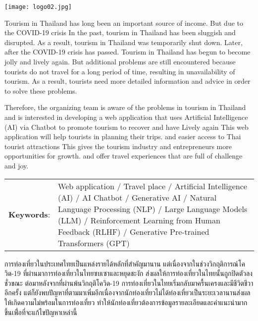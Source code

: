 \documentclass[12pt,oneside,openright,a4paper]{cpe-thai-project}
\begin{document}
\pdfstringdefDisableCommands{%
\let\MakeUppercase\relax
}

\begin{center}
  \texttt{[image: logo02.jpg]}
\end{center}
\vspace*{-1cm}

\maketitlepage
\makesignaturepage 

\abstract
\setlength{\parindent}{1cm}
Tourism in Thailand has long been an important source of income. But due to the COVID-19 crisis In the past, tourism in Thailand has been sluggish and disrupted. As a result, tourism in Thailand was temporarily shut down. Later, after the COVID-19 crisis has passed. Tourism in Thailand has begun to become jolly and lively again. But additional problems are still encountered because tourists do not travel for a long period of time, resulting in unavailability of tourism. As a result, tourists need more detailed information and advice in order to solve these problems.

Therefore, the organizing team is aware of the problems in tourism in Thailand and is interested in developing a web application that uses Artificial Intelligence (AI) via Chatbot to promote tourism to recover and have Lively again This web application will help tourists in planning their trips. and easier access to Thai tourist attractions This gives the tourism industry and entrepreneurs more opportunities for growth. and offer travel experiences that are full of challenge and joy.

\begin{flushleft}
\begin{tabular*}{\textwidth}{@{}lp{}}
\textbf{Keywords}: & Web application / Travel place / Artificial Intelligence (AI) / AI Chatbot / Generative AI / Natural Language Processing (NLP) / Large Language Models (LLM) / Reinforcement Learning from Human Feedback (RLHF) / Generative Pre-trained Transformers (GPT)
\end{tabular*}
\end{flushleft}
\endabstract

\thaiabstract
\setlength{\parindent}{1cm}
การท่องเที่ยวในประเทศไทยเป็นแหล่งรายได้หลักที่สำคัญมานาน แต่เนื่องจากในช่วงวิกฤติการณ์โควิด-19 ที่ผ่านมาการท่องเที่ยวในไทยซบเซาและหยุดชะงัก ส่งผลให้การท่องเที่ยวในไทยนั้นถูกปิดตัวลงชั่วขณะ ต่อมาหลังจากที่ผ่านพ้นวิกฤติโควิด-19 การท่องเที่ยวในไทยเริ่มกลับมาครื้นเครงและมีชีวิตชีวาอีกครั้ง แต่ก็ยังพบปัญหาที่ตามมาเพิ่มอีกเนื่องจากนักท่องเที่ยวไม่ได้ท่องเที่ยวเป็นระยะเวลานานส่งผลให้เกิดความไม่พร้อมในการท่องเที่ยว ทำให้นักท่องเที่ยวต้องการข้อมูลรายละเอียดและคำแนะนำมากขึ้นเพื่่อที่จะแก้ไขปัญหาเหล่านี้
\end{document}
